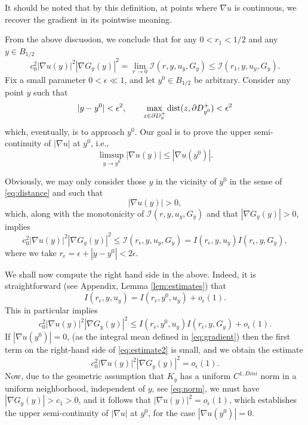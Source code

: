 \documentclass[11pt,reqno]{amsart}
\theoremstyle{plain}
\theoremstyle{remark}
\numberwithin{equation}{section}
\begin{document}
It should be noted that by this definition, 
at points where $\nabla u $ is  continuous, we recover the gradient in its pointwise meaning.




From the above discussion, we conclude  that  for any $0 < r_1 < 1/2 $  and any $y \in  B_{1/2}$ 
$$c_0^2|\nabla u (y) |^2|\nabla G_y (y) |^2 = 
\lim_{r\to 0}  \mathcal I(r,y,u_y,G_y) \leq   \mathcal I(r_1,y,u_y,G_y) .
$$
Fix a small parameter $0 < \epsilon \ll 1$, and let $y^0 \in B_{1/2}$ be arbitrary.   Consider any point $y$ such that 
\begin{equation}\label{eq:distance}
 |y - y^0| < \epsilon^2, \qquad 
\max_{z\in \partial D_{y}^+}{\hbox{dist}(z, \partial D_{y^0}^+)} < \epsilon^2
\end{equation}
which,  eventually, is to  approach $y^0$. Our goal is to prove
 the upper semi-continuity of $|\nabla u|$ at $y^0$, i.e., 
 $$\limsup_{y \to y^0} |\nabla u(y)| \leq  |\nabla u(y^0)|.$$
 
  Obviously,  we may only consider those $y$ in the vicinity of $y^0$ in the sense of \eqref{eq:distance}
and  such that  
$$      |\nabla u(y)| >  0 , $$
 which, along with    the monotonicity of ${\mathcal I} (r, y, u_y, G_y)$
and that $|\nabla G_y(y)| > 0$, implies
\begin{equation}\label{eq:estimate0}
    c_0^2|\nabla u (y) |^2|\nabla G_y (y) |^2
\leq   \mathcal I(r_\epsilon,y,u_y,G_y) = I(r_\epsilon,y,u_y) I(r_\epsilon,y,G_y)  ,
\end{equation}
where we take $r_\epsilon = \epsilon + |y - y^0| < 2\epsilon $. 





We shall now compute  the right hand side in the above. 
Indeed, it is straightforward  (see Appendix, Lemma \ref{lem:estimates}) that 
\begin{equation}\label{eq:estimate}
    I(r_\epsilon,y,u_y) =  I(r_\epsilon,y^0,u_y) + o_\epsilon (1).
\end{equation}
This in particular implies
\begin{equation}\label{eq:estimate2}
c_0^2|\nabla u (y) |^2|\nabla G_y (y) |^2 
\leq  I(r_\epsilon,y^0,u_y) I(r_\epsilon,y,G_y) +  o_\epsilon (1) .
\end{equation}
If \( |\nabla u(y^0)| = 0 \), (as the integral mean defined in \eqref{eq:gradient})
then the first term on the  right-hand side of \eqref{eq:estimate2} is small, and we obtain the estimate 
\[
c_0^2 |\nabla u(y)|^2 |\nabla G_y(y)|^2 = o_\epsilon(1).
\]
Now, due to the geometric assumption that $K_y$ has a uniform $C^{1,Dini}$ norm in a uniform neighborhood, independent of $y$, see \eqref{eq:norm}, 
we must have 
\( |\nabla G_y(y)| > c_1 > 0 \), and  it follows that
$|\nabla u(y)|^2 = o_\epsilon(1)$,
which establishes the upper semi-continuity of \( |\nabla u| \) at \( y^0 \), for the case \( |\nabla u(y^0)| = 0 \).
\end{document}

